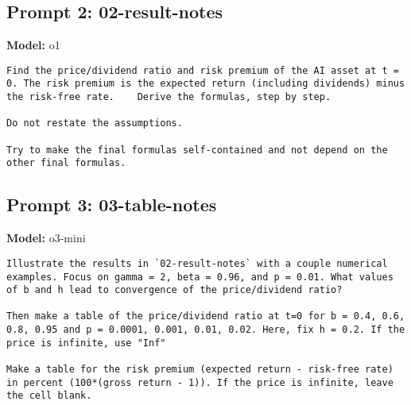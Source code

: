 \subsection*{Prompt 2: 02-result-notes}
\textbf{Model:} o1
\vspace{0.5em}
\begin{lstlisting}[language=text,breaklines=true,frame=single]
Find the price/dividend ratio and risk premium of the AI asset at t = 0. The risk premium is the expected return (including dividends) minus the risk-free rate.    Derive the formulas, step by step. 

Do not restate the assumptions.

Try to make the final formulas self-contained and not depend on the other final formulas.

\end{lstlisting}
\vspace{1em}
\subsection*{Prompt 3: 03-table-notes}
\textbf{Model:} o3-mini
\vspace{0.5em}
\begin{lstlisting}[language=text,breaklines=true,frame=single]
Illustrate the results in `02-result-notes` with a couple numerical examples. Focus on gamma = 2, beta = 0.96, and p = 0.01. What values of b and h lead to convergence of the price/dividend ratio? 

Then make a table of the price/dividend ratio at t=0 for b = 0.4, 0.6, 0.8, 0.95 and p = 0.0001, 0.001, 0.01, 0.02. Here, fix h = 0.2. If the price is infinite, use "Inf"

Make a table for the risk premium (expected return - risk-free rate) in percent (100*(gross return - 1)). If the price is infinite, leave the cell blank.

\end{lstlisting}
\vspace{1em}
